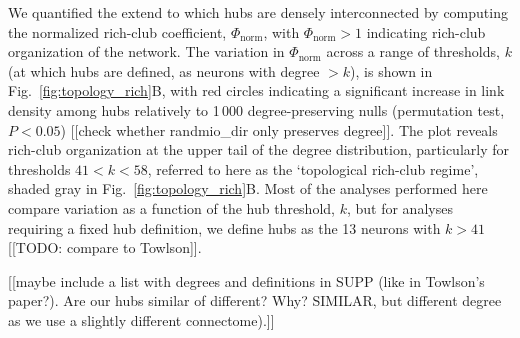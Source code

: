 \documentclass[10pt,letterpaper]{article}
\begin{document}
We quantified the extend to which hubs are densely interconnected by computing the normalized rich-club coefficient, $\Phi_\mathrm{norm}$, with $\Phi_\mathrm{norm} > 1$ indicating rich-club organization of the network.
The variation in $\Phi_\mathrm{norm}$ across a range of thresholds, $k$ (at which hubs are defined, as neurons with degree $>k$), is shown in Fig.~\ref{fig:topology_rich}B, with red circles indicating a significant increase in link density among hubs relatively to 1\,000 degree-preserving nulls (permutation test, $P < 0.05$) [[check whether randmio\_dir only preserves degree]].
The plot reveals rich-club organization at the upper tail of the degree distribution, particularly for thresholds $41 < k < 58$, referred to here as the `topological rich-club regime', shaded gray in Fig.~\ref{fig:topology_rich}B.
Most of the analyses performed here compare variation as a function of the hub threshold, $k$, but for analyses requiring a fixed hub definition, we define hubs as the 13 neurons with $k > 41$ [[TODO: compare to Towlson]].

[[maybe include a list with degrees and definitions in SUPP (like in Towlson's paper?). Are our hubs similar of different? Why? SIMILAR, but different degree as we use a slightly different connectome).]]
\end{document}
